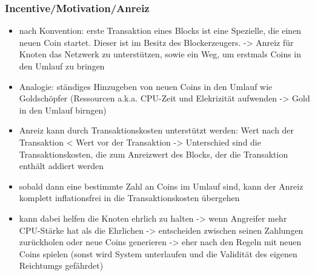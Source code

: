 \subsubsection*{Incentive/Motivation/Anreiz}
    \begin{itemize}
        \item nach Konvention: erste Transaktion eines Blocks ist eine Spezielle, die einen neuen Coin startet. Dieser ist im Besitz des Blockerzeugers. -> Anreiz für Knoten das Netzwerk zu unterstützen, sowie ein Weg, um erstmals Coins in den Umlauf zu bringen
        \item Analogie: ständiges Hinzugeben von neuen Coins in den Umlauf wie Goldschöpfer (Ressourcen a.k.a. CPU-Zeit und Elekrizität aufwenden -> Gold in den Umlauf birngen)
        \item Anreiz kann durch Transaktionskosten unterstützt werden: Wert nach der Transaktion < Wert vor der Transaktion -> Unterschied sind die Transaktionskosten, die zum Anreizwert des Blocks, der die Transaktion enthält addiert werden
        \item sobald dann eine bestimmte Zahl an Coins im Umlauf sind, kann der Anreiz komplett inflationsfrei in die Transaktionskosten übergehen
        \item kann dabei helfen die Knoten ehrlich zu halten -> wenn Angreifer mehr CPU-Stärke hat als die Ehrlichen -> entscheiden zwischen seinen Zahlungen zurückholen oder neue Coins generieren -> eher nach den Regeln mit neuen Coins spielen (sonst wird System unterlaufen und die Validität des eigenen Reichtumgs gefährdet)
    \end{itemize}
    
